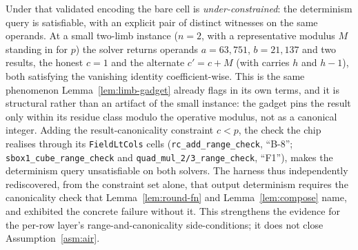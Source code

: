 Under that validated encoding the bare cell is \emph{under-constrained}: the
determinism query is satisfiable, with an explicit pair of distinct witnesses on
the same operands. At a small two-limb instance ($n=2$, with a representative
modulus $M$ standing in for $p$) the solver returns operands $a=63{,}751$,
$b=21{,}137$ and two results, the honest $c=1$ and the alternate $c'=c+M$ (with
carries $h$ and $h-1$), both satisfying the vanishing identity coefficient-wise.
This is the same phenomenon Lemma~\ref{lem:limb-gadget} already flags in its own
terms, and it is structural rather than an artifact of the small instance: the
gadget pins the result only within its residue class modulo the operative
modulus, not as a canonical integer. Adding the result-canonicality constraint $c<p$, the check
the chip realises through its \texttt{FieldLtCols} cells
(\texttt{rc\_add\_range\_check}, ``B-8''; \texttt{sbox1\_cube\_range\_check} and
\texttt{quad\_mul\_2/3\_range\_check}, ``F1''), makes the determinism query
unsatisfiable on both solvers. The harness thus independently rediscovered, from
the constraint set alone, that output determinism requires the canonicality
check that Lemma~\ref{lem:round-fn} and Lemma~\ref{lem:compose} name, and
exhibited the concrete failure without it. This strengthens the evidence for the
per-row layer's range-and-canonicality side-conditions; it does not close
Assumption~\ref{asm:air}.

